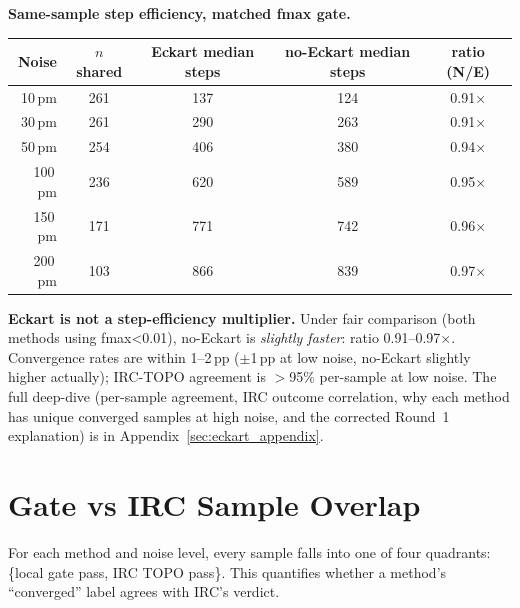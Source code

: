 \documentclass[11pt]{article}
\begin{document}
\begin{center}
\textbf{Same-sample step efficiency, matched fmax gate.} \\[0.3em]
\begin{tabular}{rcccc}
\toprule
Noise & $n$ shared & Eckart median steps & no-Eckart median steps & ratio (N/E) \\
\midrule
10\,pm  & 261 & 137 & 124 & 0.91$\times$ \\
30\,pm  & 261 & 290 & 263 & 0.91$\times$ \\
50\,pm  & 254 & 406 & 380 & 0.94$\times$ \\
100\,pm & 236 & 620 & 589 & 0.95$\times$ \\
150\,pm & 171 & 771 & 742 & 0.96$\times$ \\
200\,pm & 103 & 866 & 839 & 0.97$\times$ \\
\bottomrule
\end{tabular}
\end{center}

\textbf{Eckart is not a step-efficiency multiplier.} Under fair
comparison (both methods using fmax<0.01), no-Eckart is \emph{slightly
faster}: ratio 0.91--0.97$\times$. Convergence rates are within 1--2\,pp
($\pm$1\,pp at low noise, no-Eckart slightly higher actually); IRC-TOPO
agreement is $>$95\% per-sample at low noise. The full deep-dive
(per-sample agreement, IRC outcome correlation, why each method has
unique converged samples at high noise, and the corrected Round~1
explanation) is in Appendix~\ref{sec:eckart_appendix}.

\newpage
\clearpage
\section{Gate vs IRC Sample Overlap}

For each method and noise level, every sample falls into one of four
quadrants: \{local gate pass, IRC TOPO pass\}. This quantifies whether
a method's ``converged'' label agrees with IRC's verdict.
\end{document}
